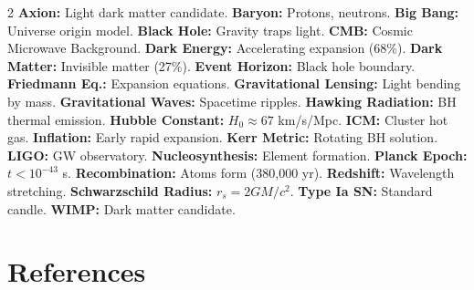 \documentclass[11pt,a4paper]{article}
\begin{document}
\begin{multicols}{2}
\footnotesize
\textbf{Axion:} Light dark matter candidate. \textbf{Baryon:} Protons, neutrons. \textbf{Big Bang:} Universe origin model. \textbf{Black Hole:} Gravity traps light. \textbf{CMB:} Cosmic Microwave Background. \textbf{Dark Energy:} Accelerating expansion (68\%). \textbf{Dark Matter:} Invisible matter (27\%). \textbf{Event Horizon:} Black hole boundary. \textbf{Friedmann Eq.:} Expansion equations. \textbf{Gravitational Lensing:} Light bending by mass. \textbf{Gravitational Waves:} Spacetime ripples. \textbf{Hawking Radiation:} BH thermal emission. \textbf{Hubble Constant:} $H_0 \approx 67$ km/s/Mpc. \textbf{ICM:} Cluster hot gas. \textbf{Inflation:} Early rapid expansion. \textbf{Kerr Metric:} Rotating BH solution. \textbf{LIGO:} GW observatory. \textbf{Nucleosynthesis:} Element formation. \textbf{Planck Epoch:} $t < 10^{-43}$ s. \textbf{Recombination:} Atoms form (380,000 yr). \textbf{Redshift:} Wavelength stretching. \textbf{Schwarzschild Radius:} $r_s = 2GM/c^2$. \textbf{Type Ia SN:} Standard candle. \textbf{WIMP:} Dark matter candidate.
\end{multicols}

\newpage

\section{References}
\label{sec:references}
\end{document}
